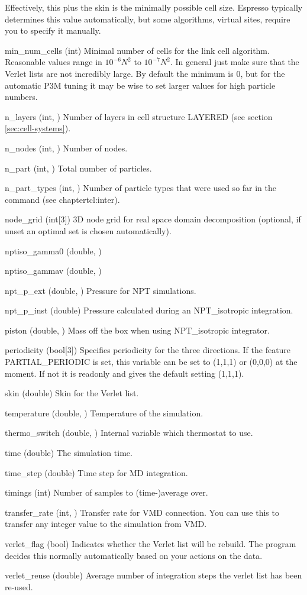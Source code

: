 \begin{globvar}
  Effectively, this plus the skin is the minimally possible cell size.
  Espresso typically determines this value automatically, but some
  algorithms, \eg{} virtual sites, require you to specify it manually.
\item[min_num_cells] (int) Minimal number of cells for the link cell
  algorithm. Reasonable values range in $10^{-6} N^2$ to $10^{-7}
  N^2$. In general just make sure that the Verlet lists are not
  incredibly large. By default the minimum is 0, but for the automatic
  P3M tuning it may be wise to set larger values for high particle
  numbers.
\item[n_layers] (int, \ro) Number of layers in cell structure LAYERED
  (see section \vref{sec:cell-systems}).
\item[n_nodes] (int, \ro) Number of nodes.
\item[n_part] (int, \ro) Total number of particles.
\item[n_part_types] (int, \ro) Number of particle types that were
  used so far in the  command (see chapter{tcl:inter}).
\item[node_grid] (int[3]) 3D node grid for real space domain
  decomposition (optional, if unset an optimal set is chosen
  automatically).
\item[nptiso_gamma0] (double, \ro)
\item[nptiso_gammav] (double, \ro)
\item[npt_p_ext] (double, \ro) Pressure for NPT simulations.
\item[npt_p_inst] (double) Pressure calculated during an
  NPT_isotropic integration.
\item[piston] (double, \ro) Mass off the box when using NPT_isotropic
  integrator.
\item[periodicity] (bool[3]) Specifies periodicity for the three
  directions. If the feature PARTIAL_PERIODIC is set, this variable
  can be set to (1,1,1) or (0,0,0) at the moment.  If not it is
  readonly and gives the default setting (1,1,1).
\item[skin] (double) Skin for the Verlet list.
\item [temperature] (double, \ro) Temperature of the
  simulation.
\item[thermo_switch] (double, \ro) Internal variable which thermostat
  to use. 
\item[time] (double) The simulation time.
\item[time_step] (double) Time step for MD integration.
\item[timings] (int) Number of samples to (time-)average over.
\item[transfer_rate] (int, \ro) Transfer rate for VMD connection. You
  can use this to transfer any integer value to the simulation from
  VMD.
\item[verlet_flag] (bool) Indicates whether the Verlet list will be
  rebuild. The program decides this normally automatically based on
  your actions on the data.
\item[verlet_reuse] (double) Average number of integration steps the
  verlet list has been re-used.
\end{globvar}

